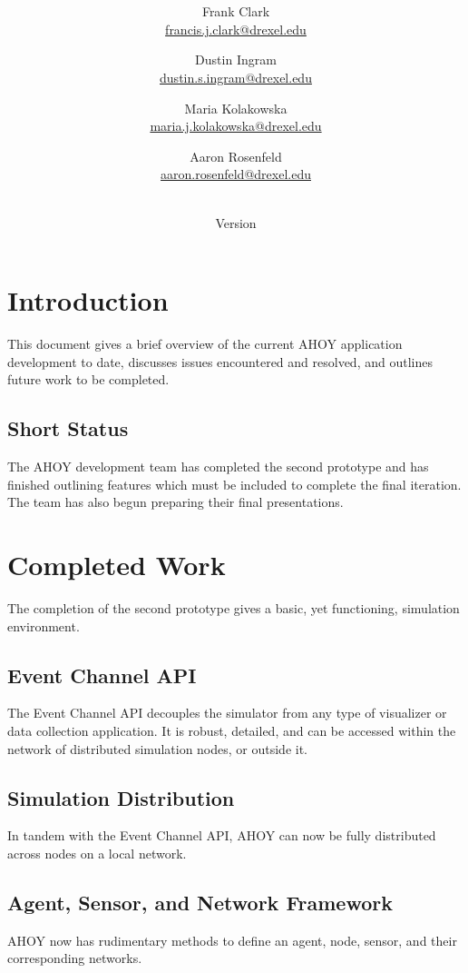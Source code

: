 \documentclass[titlepage]{article}
\title{\textbf{\mytitle}}
\author{
	Frank Clark \\\url{francis.j.clark@drexel.edu}
    \and Dustin Ingram \\\url{dustin.s.ingram@drexel.edu}
	\and Maria Kolakowska \\\url{maria.j.kolakowska@drexel.edu}
    \and Aaron Rosenfeld \\\url{aaron.rosenfeld@drexel.edu}
}
\date{\mydate\\Version \myversion}
\begin{document}

\begin{figure*}
    \centering
    \scalebox{0.8}{}
    \vspace{-4em}
\end{figure*}

\maketitle
{}

\section{Introduction}
This document gives a brief overview of the current AHOY application development to date, discusses issues encountered and resolved, and outlines future work to be completed. 

\subsection{Short Status}
The AHOY development team has completed the second prototype and has finished outlining features which must be included to complete the final iteration. The team has also begun preparing their final presentations.

\section{Completed Work}
The completion of the second prototype gives a basic, yet functioning, simulation environment. 

\subsection{Event Channel API}
The Event Channel API decouples the simulator from any type of visualizer or data collection application. It is robust, detailed, and can be accessed within the network of distributed simulation nodes, or outside it.

\subsection{Simulation Distribution}
In tandem with the Event Channel API, AHOY can now be fully distributed across nodes on a local network. 

\subsection{Agent, Sensor, and Network Framework}
AHOY now has rudimentary methods to define an agent, node, sensor, and their corresponding networks.
\end{document}

